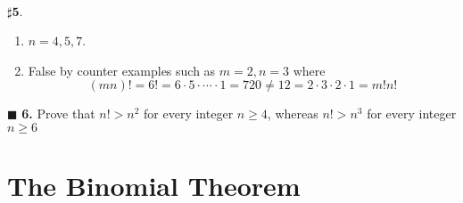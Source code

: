 \documentclass[atbegshi, chapter]{memoir}
\begin{document}
\hfill\break
$\pmb{\sharp5.}$
\begin{enumerate}[label=(\alph*)]
  \item $n=4,5,7$.
  \item False by counter examples such as $m=2,n=3$ where
    \[
      (mn)!=6!=6\cdot5\cdot\cdots\cdot1=720\neq
      12=2\cdot3\cdot2\cdot1=m!n!
    \]
\end{enumerate}\hfill$\blacksquare$
\hfill\break
\textbf{6. }
Prove that $n!>n^2$ for every integer $n\geq4$, whereas $n!>n^3$ for every
integer $n\geq 6$
\section{The Binomial Theorem}
\end{document}
